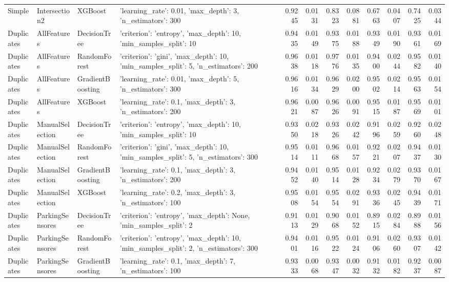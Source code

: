 \begin{tabular}{llllrrrrrrrr}
Simple & Intersection2 & XGBoost & {'learning_rate': 0.01, 'max_depth': 3, 'n_estimators': 300} & 0.9245 & 0.0131 & 0.8323 & 0.0881 & 0.6763 & 0.0407 & 0.7425 & 0.0344 \\
Duplicates & AllFeatures & DecisionTree & {'criterion': 'entropy', 'max_depth': 10, 'min_samples_split': 10} & 0.9435 & 0.0149 & 0.9375 & 0.0188 & 0.9349 & 0.0190 & 0.9361 & 0.0169 \\
Duplicates & AllFeatures & RandomForest & {'criterion': 'gini', 'max_depth': 10, 'min_samples_split': 5, 'n_estimators': 200} & 0.9638 & 0.0118 & 0.9776 & 0.0135 & 0.9400 & 0.0244 & 0.9582 & 0.0140 \\
Duplicates & AllFeatures & GradientBoosting & {'learning_rate': 0.01, 'max_depth': 5, 'n_estimators': 300} & 0.9616 & 0.0134 & 0.9629 & 0.0200 & 0.9502 & 0.0214 & 0.9563 & 0.0154 \\
Duplicates & AllFeatures & XGBoost & {'learning_rate': 0.1, 'max_depth': 3, 'n_estimators': 200} & 0.9621 & 0.0087 & 0.9626 & 0.0091 & 0.9515 & 0.0187 & 0.9569 & 0.0101 \\
Duplicates & ManualSelection & DecisionTree & {'criterion': 'entropy', 'max_depth': 10, 'min_samples_split': 10} & 0.9350 & 0.0218 & 0.9326 & 0.0242 & 0.9196 & 0.0259 & 0.9260 & 0.0248 \\
Duplicates & ManualSelection & RandomForest & {'criterion': 'gini', 'max_depth': 10, 'min_samples_split': 5, 'n_estimators': 300} & 0.9514 & 0.0111 & 0.9668 & 0.0157 & 0.9221 & 0.0207 & 0.9437 & 0.0130 \\
Duplicates & ManualSelection & GradientBoosting & {'learning_rate': 0.1, 'max_depth': 3, 'n_estimators': 200} & 0.9452 & 0.0140 & 0.9514 & 0.0128 & 0.9234 & 0.0279 & 0.9370 & 0.0167 \\
Duplicates & ManualSelection & XGBoost & {'learning_rate': 0.2, 'max_depth': 3, 'n_estimators': 100} & 0.9508 & 0.0154 & 0.9554 & 0.0291 & 0.9336 & 0.0245 & 0.9439 & 0.0171 \\
Duplicates & ParkingSensores & DecisionTree & {'criterion': 'entropy', 'max_depth': None, 'min_samples_split': 2} & 0.9113 & 0.0129 & 0.9068 & 0.0152 & 0.8915 & 0.0284 & 0.8988 & 0.0156 \\
Duplicates & ParkingSensores & RandomForest & {'criterion': 'entropy', 'max_depth': 10, 'min_samples_split': 2, 'n_estimators': 300} & 0.9401 & 0.0116 & 0.9522 & 0.0124 & 0.9106 & 0.0260 & 0.9307 & 0.0142 \\
Duplicates & ParkingSensores & GradientBoosting & {'learning_rate': 0.1, 'max_depth': 7, 'n_estimators': 100} & 0.9333 & 0.0068 & 0.9347 & 0.0032 & 0.9132 & 0.0182 & 0.9237 & 0.0087 \\

\end{tabular}
